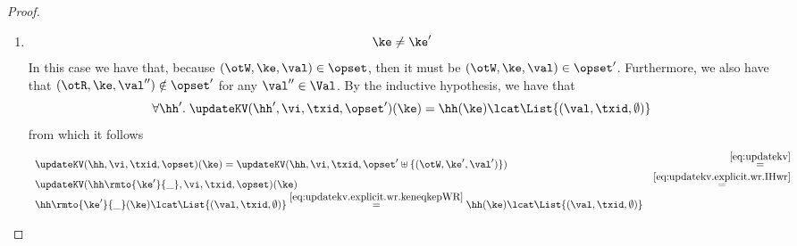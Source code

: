 \begin{proof}
\begin{enumerate}
\begin{itemize}
\begin{enumerate}
			\item 
			\begin{equation}
			\ke \neq \ke'
			\label{eq:updatekv.explicit.wr.keneqkepWR}
			\end{equation}
			In this case we have that, because $(\otW, \ke, \val) \in \opset$, then it must 
			be $(\otW, \ke, \val) \in \opset'$. Furthermore, we also have that $(\otR, \ke, \val'') \notin \opset'$ 
			for any $\val'' \in \Val$. By the inductive hypothesis, we have that 
			\begin{equation}
			\forall \hh'.\; \updateKV(\hh', \vi, \txid, \opset')(\ke) = \hh(\ke) \lcat \List{(\val, \txid, \emptyset)}
			\label{eq:updatekv.explicit.wr.IHwr}
			\end{equation}
			from which it follows 
			\[
			\begin{array}{lr}
			\updateKV(\hh, \vi, \txid, \opset)(\ke) = \updateKV(\hh, \vi, \txid, \opset' \uplus \{(\otW,\ke', \val')\}) &\stackrel{\eqref{eq:updatekv}}{=}\\
			\updateKV(\hh\rmto{\ke'}{\_}, \vi, \txid, \opset)(\ke) &\stackrel{\eqref{eq:updatekv.explicit.wr.IHwr}}{=}\\
			\hh\rmto{\ke'}{\_}(\ke) \lcat \List{(\val, \txid, \emptyset)} \stackrel{\eqref{eq:updatekv.explicit.wr.keneqkepWR}}{=} \hh(\ke) \lcat \List{(\val, \txid, \emptyset)}
			\end{array}
			\]
			\end{enumerate}
		\end{itemize}
		

\end{enumerate}
\end{proof}
